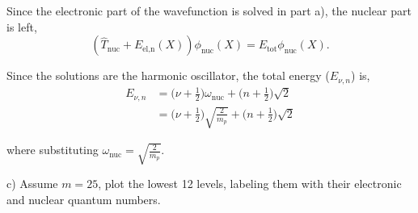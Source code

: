 \documentclass{article}
\begin{document}
{\color{blue}

Since the electronic part of the wavefunction is solved in part a), the
nuclear part is left,
\begin{equation}
  (\hat{T}_{\text{nuc}} + E_{\text{el,n}}(X))\phi_{\text{nuc}}(X)
  = E_{\text{tot}}\phi_{\text{nuc}}(X). \label{eqn:nuc}
\end{equation}
%

Since the solutions are the harmonic oscillator, the total energy
($E_{\nu,n}$) is,
\begin{align}
  E_{\nu,n}& =\Big(\nu + \frac{1}{2}\Big)\omega_{\text{nuc}}
  + \Bigg(n+\frac{1}{2}\Bigg)\sqrt{2} \nonumber \\
  & = \Big(\nu + \frac{1}{2}\Big)\sqrt{\frac{2}{m_p}}
  + \Bigg(n+\frac{1}{2}\Bigg)\sqrt{2}
\end{align}

where substituting $\omega_{\text{nuc}}=\sqrt{\frac{2}{m_p}}.$
}

\noindent c) Assume $m=25$, plot the lowest 12 levels, labeling them with their
electronic and nuclear quantum numbers.
\\
\end{document}
